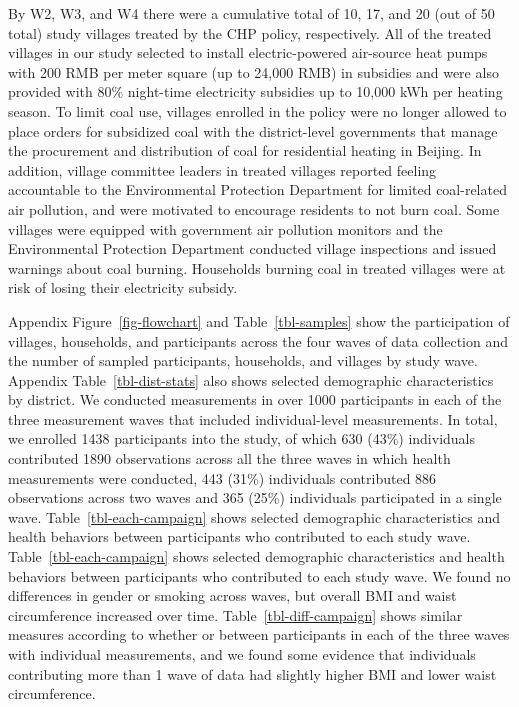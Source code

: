 \documentclass[
  letterpaper,
  DIV=11,
  numbers=noendperiod]{scrartcl}
\begin{document}
By W2, W3, and W4 there were a cumulative total of 10, 17, and 20 (out
of 50 total) study villages treated by the CHP policy, respectively. All
of the treated villages in our study selected to install
electric-powered air-source heat pumps with 200 RMB per meter square (up
to 24,000 RMB) in subsidies and were also provided with 80\% night-time
electricity subsidies up to 10,000 kWh per heating season. To limit coal
use, villages enrolled in the policy were no longer allowed to place
orders for subsidized coal with the district-level governments that
manage the procurement and distribution of coal for residential heating
in Beijing. In addition, village committee leaders in treated villages
reported feeling accountable to the Environmental Protection Department
for limited coal-related air pollution, and were motivated to encourage
residents to not burn coal. Some villages were equipped with government
air pollution monitors and the Environmental Protection Department
conducted village inspections and issued warnings about coal burning.
Households burning coal in treated villages were at risk of losing their
electricity subsidy.

Appendix Figure~\ref{fig-flowchart} and
Table~\ref{tbl-samples} show the participation of villages, households,
and participants across the four waves of data collection and the number
of sampled participants, households, and villages by study wave.
Appendix Table~\ref{tbl-dist-stats} also shows selected
demographic characteristics by district. We conducted measurements in
over 1000 participants in each of the three measurement waves that
included individual-level measurements. In total, we enrolled
1438 participants into the study, of which 630 (43\%)
individuals contributed 1890 observations across all the three waves in
which health measurements were conducted, 443 (31\%) individuals
contributed 886 observations across two waves and 365 (25\%) individuals
participated in a single wave. Table~\ref{tbl-each-campaign} shows
selected demographic characteristics and health behaviors between
participants who contributed to each study wave.
Table~\ref{tbl-each-campaign} shows selected demographic characteristics
and health behaviors between participants who contributed to each study
wave. We found no differences in gender or smoking across
waves, but overall BMI and waist circumference increased over
time. Table~\ref{tbl-diff-campaign} shows similar
measures according to whether or between participants in each of the
three waves with individual measurements, and we found some evidence
that individuals contributing more than 1 wave of data had slightly
higher BMI and lower waist circumference.
\end{document}
